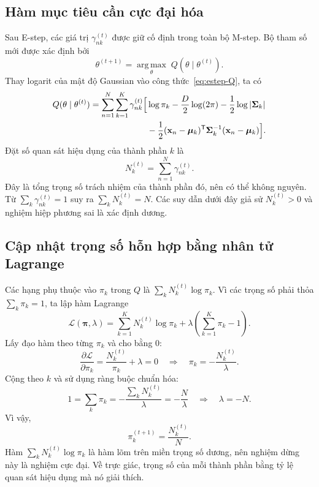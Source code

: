\subsection{Hàm mục tiêu cần cực đại hóa}
Sau E-step, các giá trị $\gamma_{nk}^{(t)}$ được giữ cố định trong toàn bộ M-step. Bộ tham số mới được xác định bởi
\begin{equation}
\theta^{(t+1)}=\underset{\theta}{\operatorname{arg\,max}}\;Q(\theta\mid\theta^{(t)}).
\end{equation}
Thay logarit của mật độ Gaussian vào công thức~\eqref{eq:estep-Q}, ta có
\begin{align}
Q(\theta\mid\theta^{(t)})
=\sum_{n=1}^N\sum_{k=1}^K\gamma_{nk}^{(t)}\Big[&\log\pi_k-\frac D2\log(2\pi)-\frac12\log|\boldsymbol{\Sigma}_k|\notag\\
&-\frac12(\mathbf{x}_n-\boldsymbol{\mu}_k)^{\mathsf T}\boldsymbol{\Sigma}_k^{-1}(\mathbf{x}_n-\boldsymbol{\mu}_k)\Big].
\label{eq:mstep-expanded}
\end{align}
Đặt số quan sát hiệu dụng của thành phần $k$ là
\begin{equation}
N_k^{(t)}=\sum_{n=1}^N\gamma_{nk}^{(t)}.
\label{eq:mstep-Nk}
\end{equation}
Đây là tổng trọng số trách nhiệm của thành phần đó, nên có thể không nguyên. Từ $\sum_k\gamma_{nk}^{(t)}=1$ suy ra $\sum_kN_k^{(t)}=N$. Các suy dẫn dưới đây giả sử $N_k^{(t)}>0$ và nghiệm hiệp phương sai là xác định dương.

\subsection{Cập nhật trọng số hỗn hợp bằng nhân tử Lagrange}
Các hạng phụ thuộc vào $\pi_k$ trong $Q$ là $\sum_kN_k^{(t)}\log\pi_k$. Vì các trọng số phải thỏa $\sum_k\pi_k=1$, ta lập hàm Lagrange
\begin{equation}
\mathcal{L}(\boldsymbol{\pi},\lambda)
=\sum_{k=1}^KN_k^{(t)}\log\pi_k+\lambda\left(\sum_{k=1}^K\pi_k-1\right).
\end{equation}
Lấy đạo hàm theo từng $\pi_k$ và cho bằng $0$:
\begin{equation}
\frac{\partial\mathcal{L}}{\partial\pi_k}
=\frac{N_k^{(t)}}{\pi_k}+\lambda=0
\quad\Longrightarrow\quad \pi_k=-\frac{N_k^{(t)}}{\lambda}.
\end{equation}
Cộng theo $k$ và sử dụng ràng buộc chuẩn hóa:
\begin{equation}
1=\sum_k\pi_k=-\frac{\sum_kN_k^{(t)}}{\lambda}=-\frac N\lambda
\quad\Longrightarrow\quad\lambda=-N.
\end{equation}
Vì vậy,
\begin{equation}
\boxed{\pi_k^{(t+1)}=\frac{N_k^{(t)}}{N}.}
\label{eq:mstep-pi}
\end{equation}
Hàm $\sum_kN_k^{(t)}\log\pi_k$ là hàm lõm trên miền trọng số dương, nên nghiệm dừng này là nghiệm cực đại. Về trực giác, trọng số của mỗi thành phần bằng tỷ lệ quan sát hiệu dụng mà nó giải thích.

